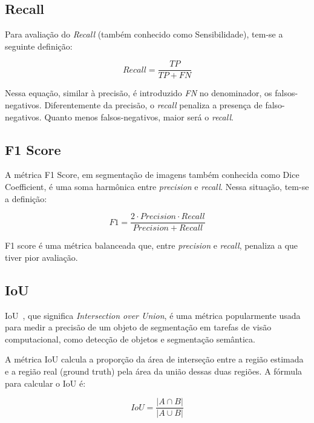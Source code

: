 \subsection{Recall}\label{sec:recall}

Para avaliação do \textit{Recall} (também conhecido como Sensibilidade), tem-se a seguinte definição:

\begin{equation}\label{eq:recall}
  Recall = \dfrac{TP}{TP + FN}
\end{equation}

Nessa equação, similar à precisão, é introduzido \textit{FN} no denominador,
os falsos-negativos. Diferentemente da precisão, o \textit{recall} penaliza
a presença de falso-negativos. Quanto menos falsos-negativos, maior
será o \textit{recall}.

\subsection{F1 Score}\label{sec:f1}

A métrica F1 Score, em segmentação de imagens também conhecida como
Dice Coefficient, é uma soma harmônica entre \textit{precision} e
\textit{recall}. Nessa situação, tem-se a definição:


\begin{equation}\label{eq:recall}
  F1 = \dfrac{2 \cdot Precision \cdot Recall}{Precision + Recall}
\end{equation}

F1 score é uma métrica balanceada que, entre \textit{precision} e \textit{recall},
penaliza a que tiver pior avaliação.

\subsection{IoU}\label{sec:iou}

IoU~\cite{rezatofighi2019generalized}, que significa
\textit{Intersection over Union}, é uma métrica popularmente usada
para medir a precisão de um objeto de segmentação em tarefas de visão
computacional, como detecção de objetos e segmentação semântica.

A métrica IoU calcula a proporção da área de interseção entre a região
estimada e a região real (ground truth) pela área da união dessas duas
regiões. A fórmula para calcular o IoU é:

\begin{equation}\label{eq:iou}
  IoU = \dfrac{\left| A \cap B \right|}{\left| A \cup B \right|}
\end{equation}


